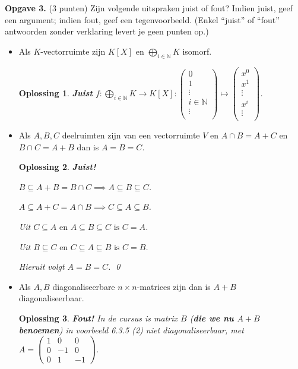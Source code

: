 \documentclass[a4paper,12pt]{article}
\newtheorem{oplossing}{Oplossing}
\begin{document}
\begin{enumerate}
\textbf{Opgave 3.} (3 punten) Zijn volgende uitspraken juist of fout? Indien juist, geef een argument; indien fout, geef een tegenvoorbeeld. (Enkel ``juist'' of ``fout'' antwoorden zonder verklaring levert je geen punten op.)
\begin{itemize}
    \item[(i)] Als $K$-vectorruimte zijn $K[X]$ en $\bigoplus_{i\in\mathbb{N}}K$ isomorf.
    \begin{oplossing}
        \textbf{Juist} \(f: \bigoplus_{i\in\mathbb{N}}K \to K[X]:  \begin{pmatrix}
            0\\
            1\\
            \vdots \\
            i \in \mathbb{N} \\
            \vdots \\
        \end{pmatrix} \mapsto 
        \begin{pmatrix}
            x^{0}\\
            x^{1} \\
            \vdots \\
            x^{i} \\
            \vdots \\
        \end{pmatrix}
        \).
    \end{oplossing}
    \item[(ii)] Als $A, B, C$ deelruimten zijn van een vectorruimte $V$ en $A \cap B = A + C$ en $B \cap C = A + B$ dan is $A = B = C$.
    \begin{oplossing}
        \textbf{Juist!}

        \(B \subseteq A + B = B \cap C \implies A \subseteq B \subseteq C\).

        \(A \subseteq A + C = A \cap B \implies C \subseteq A \subseteq B\).

        Uit \(C \subseteq A \text{ en } A \subseteq B \subseteq C \text{ is } C = A \).
        
        Uit \( B \subseteq C \text{ en } C \subseteq A \subseteq B \text{ is } C = B\). 
        
        Hieruit volgt $A = B = C$. \qed
    \end{oplossing}
    \item[(iii)] Als $A, B$ diagonaliseerbare $n \times n$-matrices zijn dan is $A+B$ diagonaliseerbaar.
    \begin{oplossing}
        \textbf{Fout!}
        In de cursus is matrix \(B\) (\textbf{die we nu \(A+B\) benoemen}) in voorbeeld 6.3.5 (2) niet diagonaliseerbaar, met
        \(A  = \begin{pmatrix}
            1 & 0 & 0 \\
            0 & -1 & 0\\
            0 & 1 & -1
        \end{pmatrix}\).


\end{oplossing}
\end{itemize}
\end{enumerate}
\end{document}
